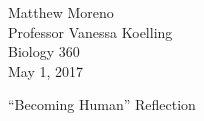 Matthew Moreno\\
Professor Vanessa Koelling\\
Biology 360\\
May 1, 2017\\

\vspace{-2ex}
\begin{center}
``Becoming Human'' Reflection
\end{center}
